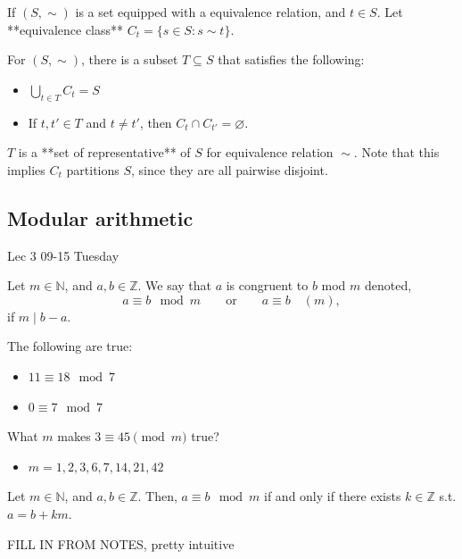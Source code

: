 \documentclass[12pt]{article}
\newcommand{\lecdate}[1]{ %
    \vspace{0in}
    \begin{flushright}
        #1
    \end{flushright}
    \vspace{0in}
}
\begin{document}
\begin{defn}
    If ${}(S, \sim){}$ is a set equipped with a equivalence relation, and ${}t\in S{}$. Let **equivalence class** ${}C_{t} = \{ s\in S: s \sim t \}{}$.
\end{defn}

\begin{thm}
    For ${}(S, \sim){}$, there is a subset ${}T \subseteq S{}$ that satisfies the following:
    \begin{itemize}
        \item ${}\bigcup_{t\in T}{C_{t}} = S {}$
        \item If ${}t,t' \in T{}$ and ${}t\neq t'{}$, then ${}C_{t}\cap C_{t'} = \varnothing{}$.
    \end{itemize}
    ${}T{}$ is a **set of representative** of ${}S{}$ for equivalence relation ${}\sim{}$. Note that this implies ${}C_{t}{}$ partitions ${}S{}$, since they are all pairwise disjoint.
\end{thm}

\subsection{Modular arithmetic}
\lecdate{Lec 3 09-15 Tuesday}

\begin{defn}
    Let ${}m\in \mathbb{N}{}$, and ${}a,b \in \mathbb{Z}{}$. We say that ${}a{}$ is congruent to ${} b{}$ mod ${}m{}$ denoted, \[
        a \equiv b \mod m \qquad \text{or} \qquad a \equiv b \quad (m),
    \]
    if ${}m \mid b-a{}$.
\end{defn}
\begin{ex} The following are true:
    \begin{itemize}
        \item ${}11 \equiv 18 \mod 7{}$
        \item ${}0 \equiv 7 \mod 7{}$
    \end{itemize}
\end{ex}
\begin{exercise}
    What $m$ makes ${}3 \equiv 45 \pmod{m}{}$ true?
    \begin{itemize}
        \item ${}m = 1, 2,3,6,7,14,21,42{}$
    \end{itemize}
\end{exercise}

\begin{lm}\label{lm:1}
    Let ${}m\in \mathbb{N}{}$, and ${}a,b \in \mathbb{Z}{}$. Then, ${}a \equiv b \mod m{}$ if and only if there exists ${}k \in \mathbb{Z}{}$ s.t. ${}a=b+km{}$.
\end{lm}
\begin{pf}
    FILL IN FROM NOTES, pretty intuitive
\end{pf}
\end{document}
